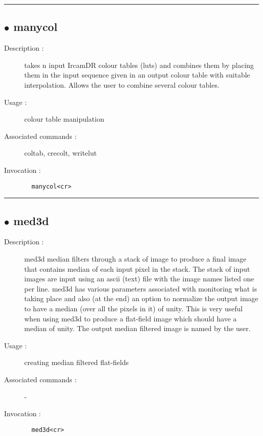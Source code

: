 \hrule \subsection*{$\bullet$ manycol}
\begin{description}
\item[Description :] takes n input IrcamDR colour tables (luts) and combines them by
placing them in the input sequence given in an output colour table with
suitable interpolation.  Allows the user to combine several colour
tables.
\item[Usage :] colour table manipulation
\item[Associated commands :] coltab, crecolt, writelut
\item[Invocation :]

\verb+  manycol<cr> +\end{description}

\hrule \subsection*{$\bullet$ med3d}
\begin{description}
\item[Description :] med3d median filters through a stack of image to produce a final
image that contains median of each input pixel in the stack.  The stack
of input images are input using an ascii (text) file with the image names
listed one per line.  med3d has various parameters associated with
monitoring what is taking place and also (at the end) an option to
normalize the output image to have a median (over all the pixels in it)
of unity.  This is very useful when using med3d to produce a flat-field
image which should have a median of unity.  The output median filtered
image is named by the user.
\item[Usage :] creating median filtered flat-fields
\item[Associated commands :] -
\item[Invocation :]

\verb+  med3d<cr> +\end{description}

